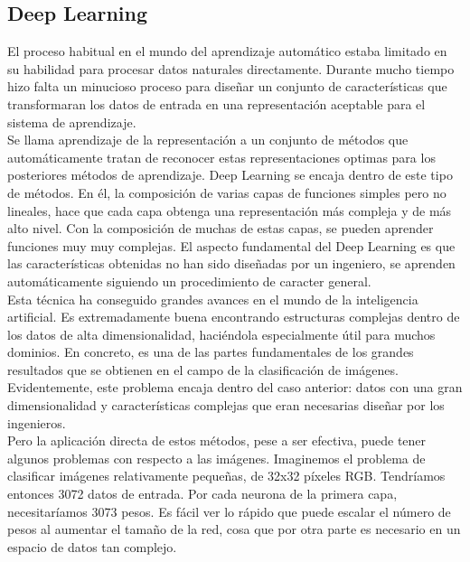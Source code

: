 \subsection{Deep Learning}

El proceso habitual en el mundo del aprendizaje automático estaba limitado en su habilidad para procesar datos naturales directamente. Durante mucho tiempo hizo falta un minucioso proceso para diseñar un conjunto de características que transformaran los datos de entrada en una representación aceptable para el sistema de aprendizaje\cite{lecun-nature}.\\

Se llama aprendizaje de la representación a un conjunto de métodos que automáticamente tratan de reconocer estas representaciones optimas para los posteriores métodos de aprendizaje. Deep Learning se encaja dentro de este tipo de métodos. En él, la composición de varias capas de funciones simples pero no lineales, hace que cada capa obtenga una representación más compleja y de más alto nivel. Con la composición de muchas de estas capas, se pueden aprender funciones muy muy complejas. El aspecto fundamental del Deep Learning es que las características obtenidas no han sido diseñadas por un ingeniero, se aprenden automáticamente siguiendo un procedimiento de caracter general.\\
 
Esta técnica ha conseguido grandes avances en el mundo de la inteligencia artificial. Es extremadamente buena encontrando estructuras complejas dentro de los datos de alta dimensionalidad, haciéndola especialmente útil para muchos dominios. En concreto, es una de las partes fundamentales de los grandes resultados que se obtienen en el campo de la clasificación de imágenes. Evidentemente, este problema encaja dentro del caso anterior: datos con una gran dimensionalidad y características complejas que eran necesarias diseñar por los ingenieros.\\

Pero la aplicación directa de estos métodos, pese a ser efectiva, puede tener algunos problemas con respecto a las imágenes. Imaginemos el problema de clasificar imágenes relativamente pequeñas, de 32x32 píxeles RGB. Tendríamos entonces 3072 datos de entrada. Por cada neurona de la primera capa, necesitaríamos 3073 pesos. Es fácil ver lo rápido que puede escalar el número de pesos al aumentar el tamaño de la red, cosa que por otra parte es necesario en un espacio de datos tan complejo.\\

